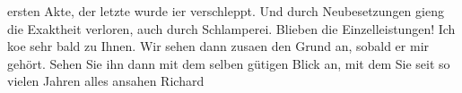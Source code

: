 \begin{ledgroupsized}[t]{13cm}
               ersten Akte, der letzte wurde i{\geminationm}er verschleppt. Und
               durch Neubesetzungen gieng die Exaktheit verloren, auch durch Schlamperei. Blieben die
               Einzelleistungen!\pend
           \pstart
           Ich ko{\geminationm}e sehr bald zu Ihnen. Wir sehen dann zusa{\geminationm}en den Grund an, sobald er mir gehört. Sehen Sie ihn
               dann mit dem selben gütigen Blick an, mit dem Sie seit so vielen Jahren alles ansahen
                  \label{T_L01519_1v}\label{T_L01519_1h}\spacefill\mbox{Richard}\pend
           \endnumbering{}\end{ledgroupsized}  \newcommand{\dateiname}{L01519}\newcommand{\titel}{Richard Beer-Hofmann an Arthur Schnitzler, 25. 5. 1905}\newcommand{\editorInnen}{Martin Anton Müller und Gerd-Hermann Susen}
      